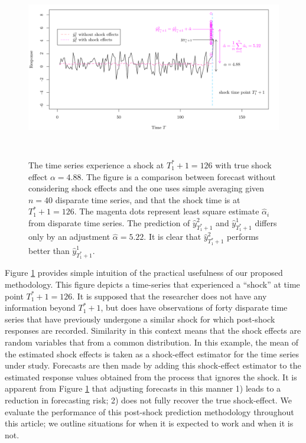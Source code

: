 \documentclass[11pt]{article}
\theoremstyle{definition}
\begin{document}
\begin{figure}
  \begin{center}
    \includegraphics[height = 8cm]{comp.pdf}
    \caption{The time series experience a shock at $T_1^*+1=126$ with true shock effect $\alpha = 4.88$. The figure is a comparison between forecast without considering shock effects and the one uses simple averaging given $n=40$ disparate time series, and that the shock time is at $T_1^* +1=126$. The magenta dots represent least square estimate $\hat{\alpha}_i$ from disparate time series. The prediction of $\hat{y}^{2}_{T_1^*+1}$ and $\hat{y}^{1}_{T_1^*+1}$ differs only by an adjustment $\hat{\alpha}=5.22$. It is clear that $\hat{y}^{2}_{T_1^*+1}$ performs better than $\hat{y}^{1}_{T_1^*+1}$.}\label{figure1}
  \end{center}  
  \vspace{-.6cm}
\end{figure}

Figure \ref{figure1} provides simple intuition of the practical usefulness of our proposed methodology. This figure depicts a time-series that experienced a ``shock'' at time point $T_1^*+1 = 126$. It is supposed that the researcher does not have any information beyond $T_1^*+1$, but does have observations of forty disparate time series that have previously undergone a similar shock for which post-shock responses are recorded. Similarity in this context means that the shock effects are random variables that from a common distribution.
In this example, the mean of the estimated shock effects is taken as a shock-effect estimator for the time series under study. Forecasts are then made by adding this shock-effect estimator to the estimated response values obtained from the process that ignores the shock. It is apparent from Figure \ref{figure1} that adjusting forecasts in this manner 1) leads to a reduction in forecasting risk; 2) does not fully recover the true shock-effect. We evaluate the performance of this post-shock prediction methodology throughout this article; we outline situations for when it is expected to work and when it is not.
\end{document}
